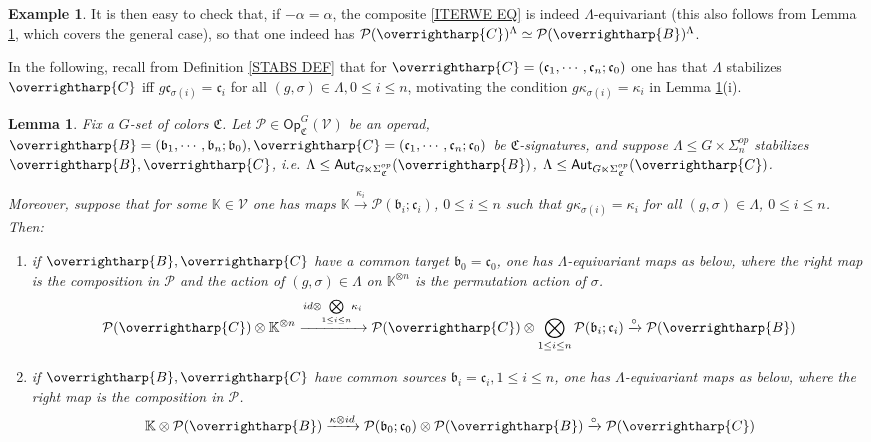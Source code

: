 \documentclass[a4paper,10pt
 ,final
]{article}%
\numberwithin{equation}{section}
\numberwithin{figure}{section}
\newtheorem{lemma}[equation]{Lemma}%
\theoremstyle{definition} %
\newtheorem{example}[equation]{Example}%
\newcommand{\vect}[1]{\text{\overrightharp{\ensuremath{#1}}}}
\newcommand{\V}{\ensuremath{\mathcal V}}
\renewcommand{\P}{\ensuremath{\mathcal P}}
\newcommand{\1}{\ensuremath{\mathbbm 1}}%
\begin{document}
\begin{example}
It is then easy to check that, if $-\alpha = \alpha$,
the composite \eqref{ITERWE EQ}
is indeed $\Lambda$-equivariant
(this also follows from Lemma \ref{LAMBEQMAPS LEM},
which covers the general case), so that one indeed has
$\P(\vect{C})^{\Lambda} \simeq \P(\vect{B})^{\Lambda}$.
\end{example}


In the following, 
recall from Definition \ref{STABS DEF} that
for 
$\vect{C} = (\mathfrak{c}_1,\cdots,\mathfrak{c}_n;\mathfrak{c}_0)$
one has that $\Lambda$ stabilizes $\vect{C}$
iff 
$g \mathfrak{c}_{\sigma(i)} = \mathfrak{c}_i$
for all $(g,\sigma) \in \Lambda, 0\leq i \leq n$,
motivating the condition $g \kappa_{\sigma(i)} = \kappa_i$
in Lemma \ref{LAMBEQMAPS LEM}(i).



\begin{lemma}\label{LAMBEQMAPS LEM}
Fix a $G$-set of colors $\mathfrak{C}$.
Let $\P \in \mathsf{Op}^G_{\mathfrak{C}}(\V)$ be an operad,
$\vect{B}=(\mathfrak{b}_1,\cdots,\mathfrak{b}_n;\mathfrak{b}_0),\vect{C}=(\mathfrak{c}_1,\cdots,\mathfrak{c}_n;\mathfrak{c}_0)$ be $\mathfrak{C}$-signatures,
and suppose 
$\Lambda \leq G \times \Sigma_n^{op}$
stabilizes $\vect{B},\vect{C}$, i.e. 
$\Lambda \leq \mathsf{Aut}_{G\ltimes \Sigma_{\mathfrak{C}}^{op}}(\vect{B})$, 
$\Lambda \leq \mathsf{Aut}_{G\ltimes \Sigma_{\mathfrak{C}}^{op}}(\vect{C})$.

Moreover, suppose that for some $\mathbb{K} \in \V$
one has maps 
$\mathbb{K} \xrightarrow{\kappa_i} \P(\mathfrak{b}_i;\mathfrak{c}_i)$,  $0\leq i \leq n$
such that $g\kappa_{\sigma(i)} = \kappa_i$ for all $(g,\sigma) \in \Lambda$, $0\leq i \leq n$. Then:
\begin{enumerate}[label=(\roman*)]
\item if $\vect{B},\vect{C}$ have a common target $\mathfrak{b}_0=\mathfrak{c}_0$,
one has
$\Lambda$-equivariant maps as below, where the right map is the composition in $\P$
and the action of $(g,\sigma) \in \Lambda$ on $\mathbb{K}^{\otimes n}$
is the permutation action of $\sigma$.
\begin{equation}\label{LAMBEQMAPS EQ}
	\P(\vect{C}) \otimes %
	\mathbb{K}^{\otimes n}
\xrightarrow{id \otimes \underset{1\leq i \leq n}{\bigotimes} \kappa_i}
	\P(\vect{C}) \otimes \bigotimes_{1\leq i \leq n} \P(\mathfrak{b}_i;\mathfrak{c}_i)
	\xrightarrow{\circ}
	\P(\vect{B})
\end{equation}
\item
if $\vect{B},\vect{C}$ have common sources $\mathfrak{b}_i=\mathfrak{c}_i,1\leq i \leq n$,
one has
$\Lambda$-equivariant maps as below, where the right map is the composition in $\P$.
\[
	\mathbb{K} \otimes \P(\vect{B}) 
\xrightarrow{\kappa \otimes id}
	\P(\mathfrak{b}_0;\mathfrak{c}_0) \otimes \P(\vect{B}) 
	\xrightarrow{\circ}
	\P(\vect{C})
\]
\end{enumerate}
\end{lemma}
\end{document}
